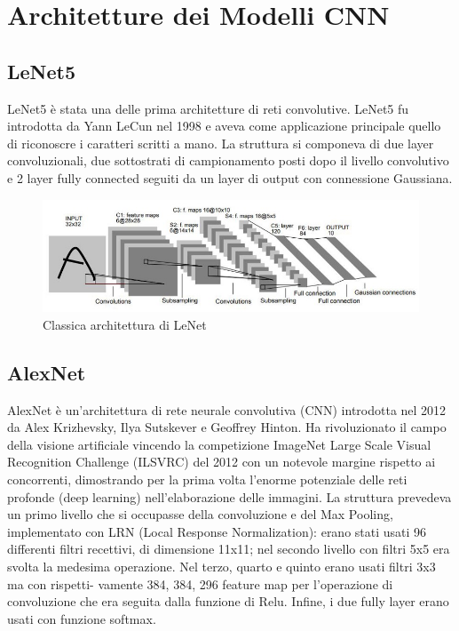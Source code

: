 \section{Architetture dei Modelli CNN}
\subsection{LeNet5}

LeNet5 è stata una delle prima architetture di reti convolutive. LeNet5 fu introdotta da Yann LeCun 
nel 1998 e aveva come applicazione principale quello di riconoscre i caratteri scritti a mano.
La struttura si componeva di due layer convoluzionali, due sottostrati di campionamento
posti dopo il livello convolutivo e 2 layer fully connected seguiti da un layer di output con
connessione Gaussiana.

\begin{figure}[H]
    \centering
    \includegraphics[width=1\textwidth]{Immagini/Generiche/LaNet5.jpeg}
    \caption{Classica architettura di LeNet}
    \label{fig:LaNet5}
\end{figure}


\subsection{AlexNet}
AlexNet è un'architettura di rete neurale convolutiva (CNN) introdotta nel 2012 da Alex 
Krizhevsky, Ilya Sutskever e Geoffrey Hinton.
Ha rivoluzionato il campo della visione artificiale vincendo la competizione ImageNet Large Scale 
Visual Recognition Challenge (ILSVRC) del 2012 con un notevole margine rispetto ai concorrenti, 
dimostrando per la prima volta l'enorme potenziale delle reti profonde (deep learning) nell'elaborazione 
delle immagini.
La struttura prevedeva un primo livello che si occupasse della convoluzione e del Max
Pooling, implementato con LRN (Local Response Normalization): erano stati usati 96
differenti filtri recettivi, di dimensione 11x11; nel secondo livello con filtri 5x5 era svolta
la medesima operazione. Nel terzo, quarto e quinto erano usati filtri 3x3 ma con rispetti-
vamente 384, 384, 296 feature map per l’operazione di convoluzione che era seguita dalla
funzione di Relu. Infine, i due fully layer erano usati con funzione softmax.

